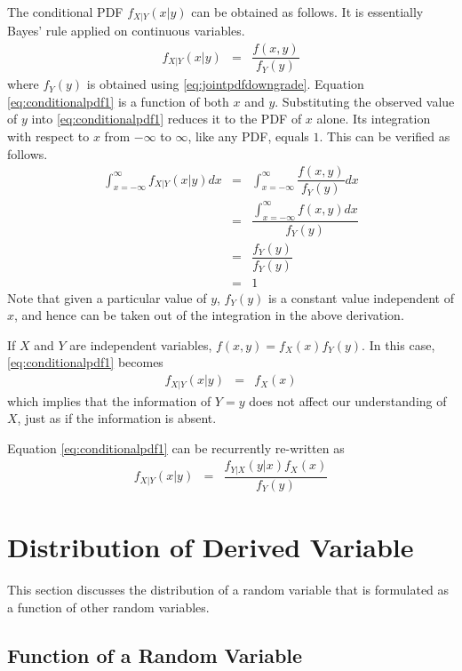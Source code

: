 The conditional PDF $f_{X|Y}(x|y)$ can be obtained as follows. It is essentially Bayes' rule applied on continuous variables.
\begin{eqnarray}
  f_{X|Y}(x|y) &=& \dfrac{f(x, y)}{f_Y(y)} \label{eq:conditionalpdf1}
\end{eqnarray}
where $f_Y(y)$ is obtained using \eqref{eq:jointpdfdowngrade}. Equation \eqref{eq:conditionalpdf1} is a function of both $x$ and $y$. Substituting the observed value of $y$ into \eqref{eq:conditionalpdf1} reduces it to the PDF of $x$ alone. Its integration with respect to $x$ from $-\infty$ to $\infty$, like any PDF, equals $1$. This can be verified as follows.
\begin{eqnarray}
  \int_{x=-\infty}^{\infty}f_{X|Y}(x|y)dx &=& \int_{x=-\infty}^{\infty}\dfrac{f(x, y)}{f_Y(y)}dx \nonumber \\
  &=& \dfrac{\int_{x=-\infty}^{\infty}f(x, y)dx}{f_Y(y)} \nonumber \\
  &=& \dfrac{f_Y(y)}{f_Y(y)} \nonumber \\
  &=& 1 \nonumber
\end{eqnarray}
Note that given a particular value of $y$, $f_Y(y)$ is a constant value independent of $x$, and hence can be taken out of the integration in the above derivation.

If $X$ and $Y$ are independent variables, $f(x,y) = f_X(x)f_Y(y)$. In this case, \eqref{eq:conditionalpdf1} becomes
\begin{eqnarray}
  f_{X|Y}(x|y) &=& f_X(x) \nonumber
\end{eqnarray}
which implies that the information of $Y=y$ does not affect our understanding of $X$, just as if the information is absent.

Equation \eqref{eq:conditionalpdf1} can be recurrently re-written as
\begin{eqnarray}
f_{X|Y}(x|y) &=& \dfrac{f_{Y|X}(y|x)f_X(x)}{f_Y(y)} \label{eq:conditionalpdf1a}
\end{eqnarray}

\section{Distribution of Derived Variable}

This section discusses the distribution of a random variable that is formulated as a function of other random variables.

\subsection{Function of a Random Variable}

